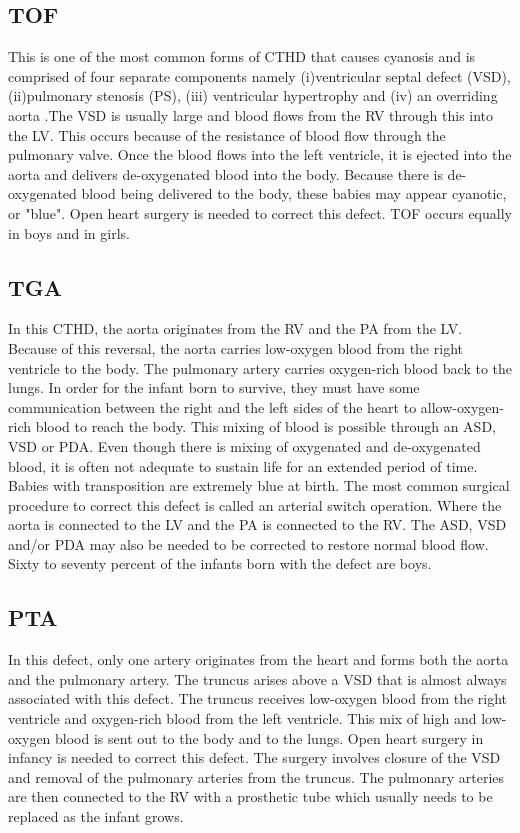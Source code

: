 \begin{refsection}
\subsection{TOF} This is one of the most common forms of CTHD that causes cyanosis and is comprised of four separate components namely (i)ventricular septal defect (VSD), (ii)pulmonary stenosis (PS), (iii) ventricular hypertrophy and (iv) an overriding aorta .The VSD is usually large and blood flows from the RV through this into the LV. This occurs because of the resistance of blood flow through the pulmonary valve. Once the blood flows into the left ventricle, it is ejected into the aorta and delivers de-oxygenated blood into the body. Because there is de-oxygenated blood being delivered to the body, these babies may appear cyanotic, or "blue". Open heart surgery is needed to correct this defect. TOF occurs equally in boys and in girls.

\subsection{TGA} In this CTHD, the aorta originates from the RV and the PA from the LV. Because of this reversal, the aorta carries low-oxygen blood from the right ventricle to the body. The pulmonary artery carries oxygen-rich blood back to the lungs. In order for the infant born to survive, they must have some communication between the right and the left sides of the heart to allow-oxygen-rich blood to reach the body. This mixing of blood is possible through an ASD, VSD or PDA. Even though there is mixing of oxygenated and de-oxygenated blood, it is often not adequate to sustain life for an extended period of time. Babies with transposition are extremely blue at birth. The most common surgical procedure to correct this defect is called an arterial switch operation. Where the aorta is connected to the LV and the PA is connected to the RV. The ASD, VSD and/or PDA may also be needed to be corrected to restore normal blood flow. Sixty to seventy percent of the infants born with the defect are boys.

\subsection{PTA} In this defect, only one artery originates from the heart and forms both the aorta and the pulmonary artery. The truncus arises above a VSD that is almost always associated with this defect. The truncus receives low-oxygen blood from the right ventricle and oxygen-rich blood from the left ventricle. This mix of high and low-oxygen blood is sent out to the body and to the lungs. Open heart surgery in infancy is needed to correct this defect. The surgery involves closure of the VSD and removal of the pulmonary arteries from the truncus. The pulmonary arteries are then connected to the RV with a prosthetic tube which usually needs to be replaced as the infant grows.


\end{refsection}
